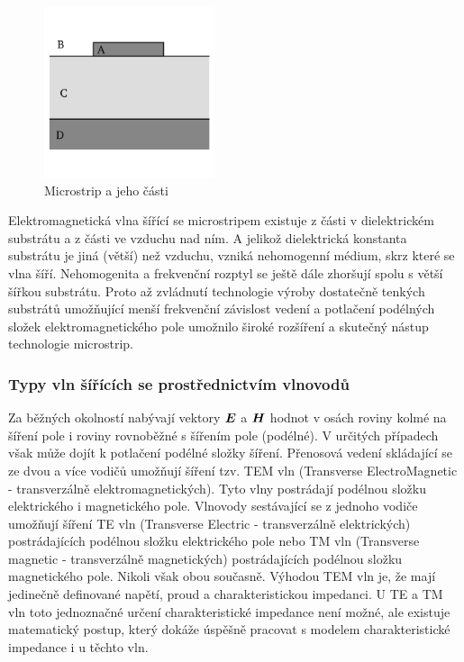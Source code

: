 \documentclass[12pt,a4paper,oneside]{article}
\numberwithin{equation}{section} %
\numberwithin{figure}{section} %
\numberwithin{table}{section} %
\renewcommand{\vec}[1]{\mbox{\boldmath$#1$}} %
\begin{document}
\begin{figure}[h] 
\begin{center}
\includegraphics[width=5cm]{microstrip.png}
\caption{Microstrip a jeho části}
\label{microstrip}
\end{center}
\end{figure}

Elektromagnetická vlna šířící se microstripem existuje z části v dielektrickém substrátu a z části ve vzduchu nad ním. A jelikož dielektrická konstanta substrátu je jiná (větší) než vzduchu, vzniká nehomogenní médium, skrz které se vlna šíří. Nehomogenita a frekvenční rozptyl se ještě dále zhoršují spolu s větší šířkou substrátu. Proto až zvládnutí technologie výroby dostatečně tenkých substrátů umožňující menší frekvenční závislost vedení a potlačení podélných složek elektromagnetického pole umožnilo široké rozšíření a skutečný nástup technologie microstrip.

\subsubsection{Typy vln šířících se prostřednictvím vlnovodů}
Za běžných okolností nabývají vektory $\vec{E}$ a $\vec{H}$ hodnot v osách roviny kolmé na šíření pole i roviny rovnoběžné s šířením pole (podélné). V určitých případech však může dojít k potlačení podélné složky šíření. Přenosová vedení skládající se ze dvou a více vodičů umožňují šíření tzv. TEM vln (Transverse ElectroMagnetic - transverzálně elektromagnetických). Tyto vlny postrádají podélnou složku elektrického i magnetického pole. Vlnovody sestávající se z jednoho vodiče umožňují šíření TE vln (Transverse Electric - transverzálně elektrických) postrádajících podélnou složku elektrického pole nebo TM vln (Transverse magnetic - transverzálně magnetických) postrádajících podélnou složku magnetického pole. Nikoli však obou současně. Výhodou TEM vln je, že mají jedinečně definované napětí, proud a charakteristickou impedanci. U TE a TM vln toto jednoznačné určení charakteristické impedance není možné, ale existuje matematický postup, který dokáže úspěšně pracovat s modelem charakteristické impedance i u těchto vln.
\end{document}
